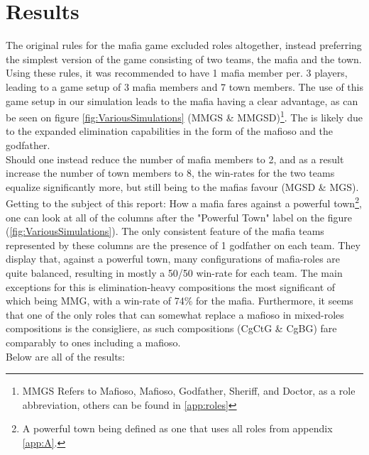 \section{Results}\label{sec:results}
The original rules for the mafia game excluded roles altogether, instead
preferring the simplest version of the game consisting of two teams, the mafia
and the town. Using these rules\cite{MafiaRules}, it was recommended to have 1
mafia member per. 3 players, leading to a game setup of 3 mafia members and 7
town members. The use of this game setup in our simulation leads to the mafia
having a clear advantage, as can be seen on figure \ref{fig:VariousSimulations}
(MMGS \& MMGSD)\footnote{MMGS Refers to Mafioso, Mafioso, Godfather, Sheriff,
    and Doctor, as a role abbreviation, others can be found in \ref{app:roles}}.
The is likely due to the expanded elimination capabilities in the form of the
mafioso and the godfather. \\ Should one instead reduce the number of mafia
members to 2, and as a result increase the number of town members to 8, the
win-rates for the two teams equalize significantly more, but still being to the
mafias favour (MGSD \& MGS).\\ Getting to the subject of this report: How a
mafia fares against a powerful town\footnote{A powerful town being defined as
    one that uses all roles from appendix \ref{app:A}.}, one can look at all of the
columns after the "Powerful Town" label on the figure
(\ref{fig:VariousSimulations}). The only consistent feature of the mafia teams
represented by these columns are the presence of 1 godfather on each team. They
display that, against a powerful town, many configurations of mafia-roles are
quite balanced, resulting in mostly a 50/50 win-rate for each team. The main
exceptions for this is elimination-heavy compositions the most significant of
which being MMG, with a win-rate of 74\% for the mafia. Furthermore, it seems
that one of the only roles that can somewhat replace a mafioso in mixed-roles
compositions is the consigliere, as such compositions (CgCtG \& CgBG) fare
comparably to ones including a mafioso. \\ Below are all of the results:
